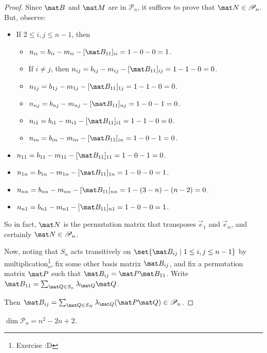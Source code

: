 \documentclass[a4paper,12pt]{article}
\begin{document}
\begin{proof}
 Since \(\mat B\) and \(\mat M\) are in \(\mathscr P_n\), it suffices to prove
 that \(\mat N \in \mathscr P_n\). But, observe:
 \begin{itemize}
  \item
   If \(2 \le i, j \le n - 1\), then
   \begin{itemize}
    \item
     \(n_{ii} = b_{ii} - m_{ii} - [\mat B_{11}]_{ii} = 1 - 0 - 0 = 1\).
    \item
     If \(i \ne j\), then
     \(n_{ij} = b_{ij} - m_{ij} - [\mat B_{11}]_{ij} = 1 - 1 - 0 = 0\).
    \item
     \(n_{1j} = b_{1j} - m_{1j} - [\mat B_{11}]_{1j} = 1 - 1 - 0 = 0\).
    \item
     \(n_{nj} = b_{nj} - m_{nj} - [\mat B_{11}]_{nj} = 1 - 0 - 1 = 0\).
    \item
     \(n_{i1} = b_{i1} - m_{i1} - [\mat B_{11}]_{i1} = 1 - 1 - 0 = 0\).
    \item
     \(n_{in} = b_{in} - m_{in} - [\mat B_{11}]_{in} = 1 - 0 - 1 = 0\).
   \end{itemize}
  \item
   \(n_{11} = b_{11} - m_{11} - [\mat B_{11}]_{11} = 1 - 0 - 1 = 0\).
  \item
   \(n_{1n} = b_{1n} - m_{1n} - [\mat B_{11}]_{1n} = 1 - 0 - 0 = 1\).
  \item
   \(n_{nn}
     = b_{nn} - m_{nn} - [\mat B_{11}]_{nn} = 1 - (3 - n) - (n - 2) = 0\).
  \item
   \(n_{n1} = b_{n1} - m_{n1} - [\mat B_{11}]_{n1} = 1 - 0 - 0 = 1\).
 \end{itemize}
 So in fact, \(\mat N\) is the permutation matrix that transposes \(\vec e_1\)
 and \(\vec e_n\), and certainly \(\mat N \in \mathscr P_n\).

 Now, noting that \(S_n\) acts transitively on
 \(\set{\mat B_{ij} \mid 1 \le i, j \le n - 1}\) by multiplication\footnote{%
  Exercise :D}, fix some other basis matrix
 \(\mat B_{ij}\), and fix a permutation matrix \(\mat P\) such that
 \(\mat B_{ij} = \mat P \mat B_{11}\). Write
 \(\mat B_{11} = \sum_{\mat Q \in S_n} \lambda_{\mat Q} \mat Q\).

 Then
 \(\mat B_{ij}
   = \sum_{\mat Q \in S_N} \lambda_{\mat Q} (\mat P \mat Q)
   \in \mathscr P_n\).
\end{proof}
\begin{corollary}
 \(\dim \mathscr P_n = n^2 - 2n + 2\).
\end{corollary}
\end{document}
